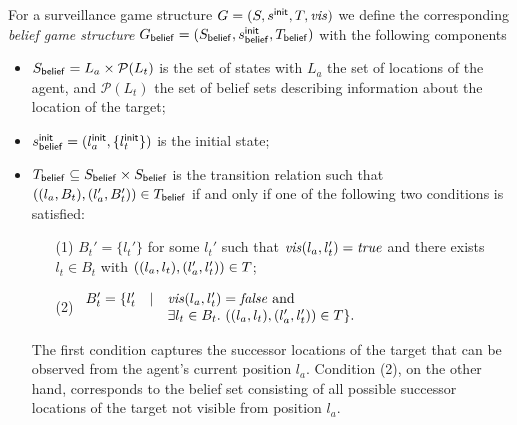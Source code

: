 For a surveillance game structure $G  = (S,s^{\mathsf{init}},T,\mathit{vis})$ we define the corresponding \emph{belief game structure} $G_{\mathsf{belief}}  = (S_{\mathsf{belief}},s^{\mathsf{init}}_{\mathsf{belief}},T_{\mathsf{belief}})$ with the following components
\begin{itemize}
\item $S_{\mathsf{belief}} = L_a \times \mathcal P(L_t)$ is the set of states with $L_a$ the set of locations of the agent, and $\mathcal P(L_t)$ the set of belief sets describing information about the location of the target;
\item $s^{\mathsf{init}}_{\mathsf{belief}} = (l_a^{\mathsf{init}},\{l_t^{\mathsf{init}}\})$ is the initial state;
\item $T_{\mathsf{belief}} \subseteq S_{\mathsf{belief}} \times S_{\mathsf{belief}}$ is the transition relation such that $((l_a, B_t),(l_a', B_t')) \in T_{\mathsf{belief}}$ if and only if one of the following two conditions is satisfied:
\begin{itemize}
\item[(1)] $B_t' = \{l_t'\}$ for some $l_t'$ such that $\mathit{vis}(l_a,l_t') = \mathit{true}$ and
there exists $l_t \in B_t$ with $((l_a,l_t),(l_a',l_t')) \in T$;
\item[(2)] $\begin{array}{lll}
B_t' = \{l_t' & \mid & \mathit{vis}(l_a,l_t') = \mathit{false} \text{ and } \\
&& \exists l_t \in B_t.\ ((l_a,l_t),(l_a',l_t')) \in T\}. 
\end{array}
$
\end{itemize}
The first condition captures the successor locations of the target that can be observed from the agent's current position $l_a$. Condition (2), on the other hand, corresponds to the belief set consisting of all possible successor locations of the target not visible from position $l_a$. 

\end{itemize}
